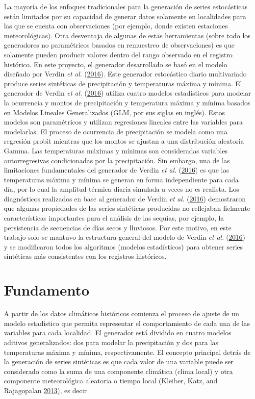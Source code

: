 \documentclass[
  12pt]{article}
\begin{document}
La mayoría de los enfoques tradicionales para la generación de series estocásticas están limitados por su capacidad de generar datos solamente en localidades para las que se cuenta con observaciones (por ejemplo, donde existen estaciones meteorológicas). Otra desventaja de algunas de estas herramientas (sobre todo los generadores no paramétricos basados en remuestreo de observaciones) es que solamente pueden producir valores dentro del rango observado en el registro histórico. En este proyecto, el generador desarrollado se basó en el modelo diseñado por Verdin \emph{et al.} (\protect\hyperlink{ref-RN3540}{2016}). Este generador estocástico diario multivariado produce series sintéticas de precipitación y temperaturas máxima y mínima. El generador de Verdin \emph{et al.} (\protect\hyperlink{ref-RN3540}{2016}) utiliza cuatro modelos estadísticos para modelar la ocurrencia y montos de precipitación y temperatura máxima y mínima basados en Modelos Lineales Generalizados (GLM, por sus siglas en inglés). Estos modelos son paramétricos y utilizan regresiones lineales entre las variables para modelarlas. El proceso de ocurrencia de precipitación se modela como una regresión probit mientras que los montos se ajustan a una distribución aleatoria Gamma. Las temperaturas máximas y mínimas son consideradas variables autorregresivas condicionadas por la precipitación. Sin embargo, una de las limitaciones fundamentales del generador de Verdin \emph{et al.} (\protect\hyperlink{ref-RN3540}{2016}) es que las temperaturas máxima y mínima se generan en forma independiente para cada día, por lo cual la amplitud térmica diaria simulada a veces no es realista.
Los diagnósticos realizados en base al generador de Verdin \emph{et al.} (\protect\hyperlink{ref-RN3540}{2016}) demostraron que algunas propiedades de las series sintéticas producidas no reflejaban fielmente características importantes para el análisis de las sequías, por ejemplo, la persistencia de secuencias de días secos y lluviosos. Por este motivo, en este trabajo solo se mantuvo la estructura general del modelo de Verdin \emph{et al.} (\protect\hyperlink{ref-RN3540}{2016}) y se modificaron todos los algoritmos (modelos estadísticos) para obtener series sintéticas más consistentes con los registros históricos.

\hypertarget{fundamento}{%
\section{Fundamento}\label{fundamento}}

A partir de los datos climáticos históricos comienza el proceso de ajuste de un modelo estadístico que permita representar el comportamiento de cada una de las variables para cada localidad. El generador está dividido en cuatro modelos aditivos generalizados: dos para modelar la precipitación y dos para las temperaturas máxima y mínima, respectivamente. El concepto principal detrás de la generación de series sintéticas es que cada valor de una variable puede ser considerado como la suma de una componente climática (clima local) y otra componente meteorológica aleatoria o tiempo local (Kleiber, Katz, and Rajagopalan \protect\hyperlink{ref-RN3538}{2013}), es decir
\end{document}

